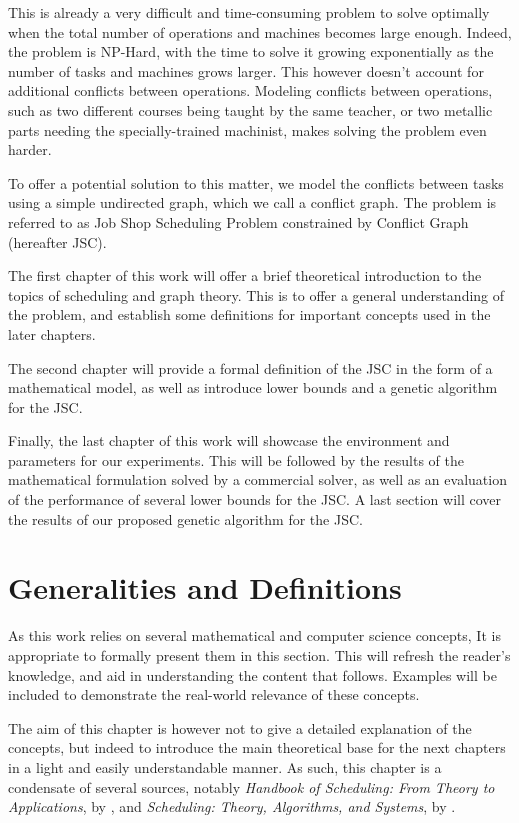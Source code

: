 \documentclass{mimosis}
\begin{document}
This is already a very difficult and time-consuming problem to solve optimally when the total number of operations and machines becomes large enough. Indeed, the problem is NP-Hard, with the time to solve it growing exponentially as the number of tasks and machines grows larger. This however doesn't account for additional conflicts between operations. Modeling conflicts between operations, such as two different courses being taught by the same teacher, or two metallic parts needing the specially-trained machinist, makes solving the problem even harder. 

To offer a potential solution to this matter, we model the conflicts between tasks using a simple undirected graph, which we call a conflict graph. The problem is referred to as Job Shop Scheduling Problem constrained by Conflict Graph (hereafter JSC).

The first chapter of this work will offer a brief theoretical introduction to the topics of scheduling and graph theory. This is to offer a general understanding of the problem, and establish some definitions for important concepts used in the later chapters.

The second chapter will provide a formal definition of the JSC in the form of a mathematical model, as well as introduce lower bounds and a genetic algorithm for the JSC.

Finally, the last chapter of this work will showcase the environment and parameters for our experiments. This will be followed by the results of the mathematical formulation solved by a commercial solver, as well as an evaluation of the performance of several lower bounds for the JSC. A last section will cover the results of our proposed genetic algorithm for the JSC.

\chapter{Generalities and Definitions}

As this work relies on several mathematical and computer science concepts, It is appropriate to formally present them in this section. This will refresh the reader's knowledge, and aid in understanding the content that follows. Examples will be included to demonstrate the real-world relevance of these concepts.

The aim of this chapter is however not to give a detailed explanation of the concepts, but indeed to introduce the main theoretical base for the next chapters in a light and easily understandable manner. As such, this chapter is a condensate of several sources, notably \emph{Handbook of Scheduling: From Theory to Applications}, by \citet{blazewicz2007handbook},  and \emph{Scheduling: Theory, Algorithms, and Systems}, by \citet{pinedo2008scheduling}.
\end{document}
